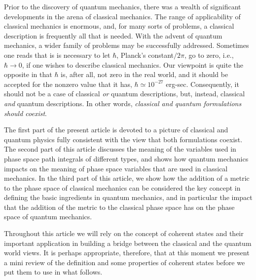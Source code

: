 \documentclass[12pt]{article}
\def\ra{\rightarrow}
\begin{document}
Prior to the discovery of quantum mechanics, there was a wealth of 
significant developments in the arena of classical mechanics. The range of 
applicability of classical mechanics is enormous, and, for many sorts of 
problems, a classical description is frequently all that is needed. With 
the advent of quantum mechanics, a wider family of problems may be 
successfully addressed. Sometimes one reads that is is necessary to let 
$\hbar$, Planck's constant$/2\pi$, go to zero, i.e., $\hbar\ra0$, if one 
wishes to describe classical mechanics. Our viewpoint is quite the 
opposite in that $\hbar$ is, after all, not zero in the real world, and 
it should be accepted for the nonzero value that it has, 
$\hbar\simeq 10^{-27}$ erg-sec. Consequently, it should not be a case of 
classical {\it or} quantum descriptions, but, instead, classical 
{\it and} quantum descriptions. In other words, {\it classical and 
quantum formulations should coexist}.

The first part of the present article is devoted to a picture of classical 
and quantum physics fully consistent with the view that both formulations 
coexist. The second part of this article discusses the meaning of the 
variables used in phase space path integrals of different types, and 
shows how quantum mechanics impacts on the meaning of phase space 
variables that are used in classical mechanics. In the third part of 
this article, we show how the addition of a metric to the phase space of
classical mechanics can be considered the key concept in defining the 
basic ingredients in quantum mechanics, and in particular the impact that 
the addition of the metric to the classical phase space has on the phase 
space of quantum mechanics. 

Throughout this article we will rely on the concept of coherent states and 
their important application in building a bridge between the classical and 
the quantum world views. It is perhaps appropriate, therefore, that at this 
moment we present a mini review of the definition and some properties of 
coherent states before we put them to use in what follows.
\end{document}
